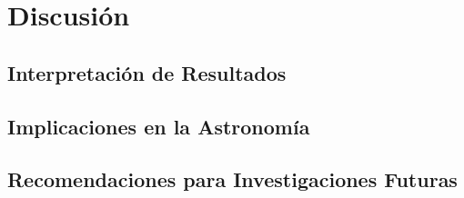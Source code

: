 \documentclass[../Main.tex]{subfiles}
\begin{document}
\section{Discusión}

\subsection{Interpretación de Resultados}
\lipsum[1] %

\subsection{Implicaciones en la Astronomía}
\lipsum[2] %

\subsection{Recomendaciones para Investigaciones Futuras}
\lipsum[3] %

\biblio 
\end{document}
